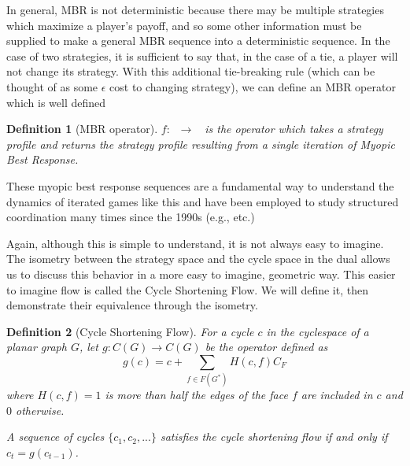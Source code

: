 \documentclass{article}
\newtheorem{definition}{Definition}[section]
\DeclareMathOperator{\At}{\mathcal{A}_{G}^{(2)}}
\begin{document}
    In general, MBR is not deterministic because there may be multiple strategies which maximize a player's payoff, and so some other information must be supplied to make a general MBR sequence into a deterministic sequence. In the case of two strategies, it is sufficient to say that, in the case of a tie, a player will not change its strategy. With this additional tie-breaking rule (which can be thought of as some $\epsilon$ cost to changing strategy), we can define an MBR operator which is well defined

    \begin{definition}[MBR operator]
        $f:\At \to \At$ is the operator which takes a strategy profile and returns the strategy profile resulting from a single iteration of Myopic Best Response. 
    \end{definition}

    These myopic best response sequences are a fundamental way to understand the dynamics of iterated games like this and have been employed to study structured coordination many times since the 1990s (e.g., \cite{Kandori1993,Ellison1993,Ellison2000,Oechssler1997,Oechssler1999} etc.)

    Again, although this is simple to understand, it is not always easy to imagine. The isometry between the strategy space and the cycle space in the dual allows us to discuss this behavior in a more easy to imagine, geometric way. This easier to imagine flow is called the Cycle Shortening Flow. We will define it, then demonstrate their equivalence through the isometry.

    \begin{definition}[Cycle Shortening Flow] For a cycle $c$ in the cyclespace of a planar graph $G$, let $g:C(G)\to C(G)$ be the operator defined as 
    \[g(c)=c+\sum_{f\in F(G^*)}H(c,f)C_F\]
    where $H(c,f)=1$ is more than half the edges of the face $f$ are included in $c$ and $0$ otherwise.

    A sequence of cycles $\{c_1,c_2,...\}$ satisfies the cycle shortening flow if and only if $c_t=g(c_{t-1})$.
    \end{definition}
\end{document}

